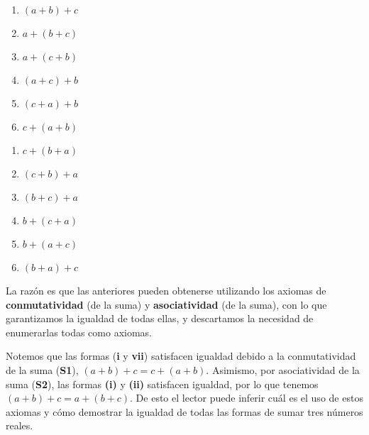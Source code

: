 \documentclass[11pt]{article}
\begin{document}
\begin{adjustbox}{minipage=0.5\linewidth,margin=0pt \smallskipamount,center}
    \noindent\begin{minipage}[c]{.5\linewidth}
    \begin{enumerate}[label=\roman*.]
        \item $(a+b)+c$
        \item $a+(b+c)$
        \item $a+(c+b)$
        \item $(a+c)+b$
        \item $(c+a)+b$
        \item $c+(a+b)$
    \end{enumerate}
    \end{minipage}%
\begin{minipage}[c]{.5\linewidth}
    \begin{enumerate}[start=7,label=\roman*.]
        \item $c+(b+a)$
        \item $(c+b)+a$
        \item $(b+c)+a$
        \item $b+(c+a)$
        \item $b+(a+c)$
        \item $(b+a)+c$
    \end{enumerate}
\end{minipage}
\end{adjustbox}
La razón es que las anteriores pueden obtenerse utilizando los axiomas de \textbf{conmutatividad} (de la suma) y \textbf{asociatividad} (de la suma), con lo que garantizamos la igualdad de todas ellas, y descartamos la necesidad de enumerarlas todas como axiomas.

Notemos que las formas (\textbf{i} y \textbf{vii}) satisfacen igualdad debido a la conmutatividad de la suma (\textbf{S1}), $(a+b)+c=c+(a+b)$. Asimismo, por asociatividad de la suma (\textbf{S2}), las formas \textbf{(i)} y \textbf{(ii)} satisfacen igualdad, por lo que tenemos $(a+b)+c=a+(b+c)$. De esto el lector puede inferir cuál es el uso de estos axiomas y cómo demostrar la igualdad de todas las formas de sumar tres números reales.
\end{document}

